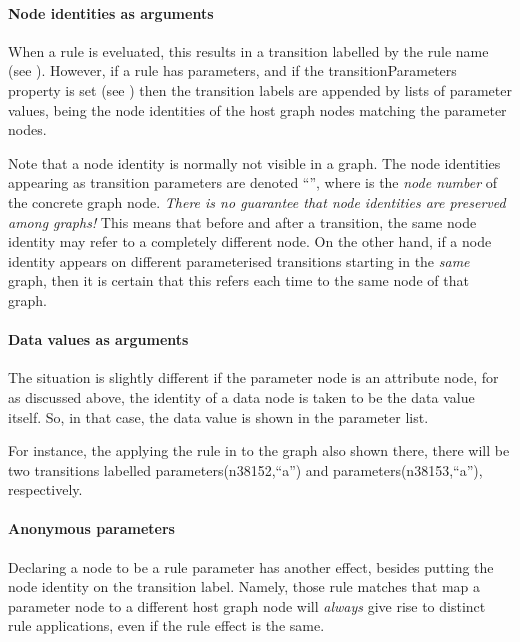 \paragraph{Node identities as arguments}

When a rule is eveluated, this results in a transition labelled by the rule
name (see ). However, if a rule has parameters, and if the
\textsf{transitionParameters} property is set (see )
then the transition labels are appended by lists of parameter values, being the
node identities of the host graph nodes matching the parameter nodes.

Note that a node identity is normally not visible in a graph. The node
identities appearing as transition parameters are denoted ``'', where  is the \emph{node number} of the concrete graph
node. \emph{There is no guarantee that node identities are preserved among
graphs!} This means that before and after a transition, the same node identity
may refer to a completely different node. On the other hand, if a node identity
appears on different parameterised transitions starting in the \emph{same}
graph, then it is certain that this refers each time to the same node of that
graph.

\paragraph{Data values as arguments}

The situation is slightly different if the parameter node is an attribute node,
for as discussed above, the identity of a data node is taken to be the data
value itself. So, in that case, the data value is shown in the parameter list.

For instance, the applying the rule in  to the graph also
shown there, there will be two transitions labelled
\textsf{parameters(n38152,``a'')} and \textsf{parameters(n38153,``a'')},
respectively.

\paragraph{Anonymous parameters}

Declaring a node to be a rule parameter has another effect, besides putting the
node identity on the transition label. Namely, those rule matches that map a
parameter node to a different host graph node will \emph{always} give rise to
distinct rule applications, even if the rule effect is the same. 

